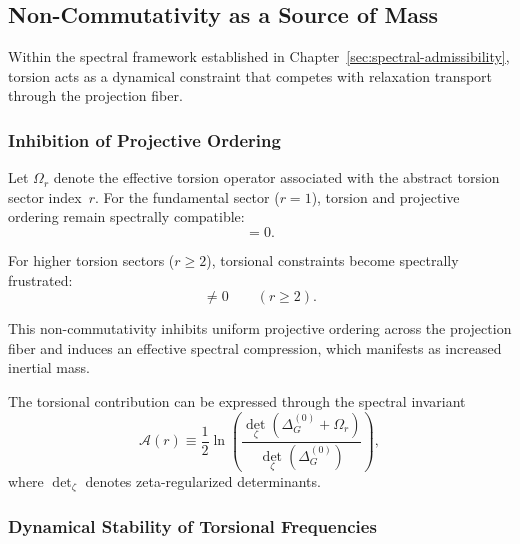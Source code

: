 \subsection{Non-Commutativity as a Source of Mass}
  \label{sec:noncommutativity-mass}

  Within the spectral framework established in Chapter~\ref{sec:spectral-admissibility},
  torsion acts as a dynamical constraint that competes with
  relaxation transport through the projection fiber.

  \subsubsection*{Inhibition of Projective Ordering}
    \label{sec:inhibition-relaxation}

    Let $\Omega_r$ denote the effective torsion operator associated
    with the abstract torsion sector index~$r$.
    For the fundamental sector ($r=1$),
    torsion and projective ordering remain spectrally compatible:
    \begin{equation}
      [\Delta^{(0)}_G,\Omega_{1}] = 0 .
    \end{equation}

    For higher torsion sectors ($r\ge 2$), torsional constraints
    become spectrally frustrated:
    \begin{equation}
      [\Delta^{(0)}_G,\Omega_{r}] \neq 0
      \qquad (r\ge 2).
    \end{equation}

    This non-commutativity inhibits uniform projective ordering across the
    projection fiber and induces an effective spectral compression,
    which manifests as increased inertial mass.

    The torsional contribution can be expressed through the spectral
    invariant
    \begin{equation}
      \mathcal{A}(r) \equiv
      \frac12 \ln\!\left(
                     \frac{\det_\zeta(\Delta^{(0)}_G+\Omega_{r})}
                     {\det_\zeta(\Delta^{(0)}_G)}
      \right),
      \label{eq:Aw-fredholm}
    \end{equation}
    where $\det_\zeta$ denotes zeta-regularized determinants.

  \subsubsection*{Dynamical Stability of Torsional Frequencies}
    \label{sec:pisano-ratio}

